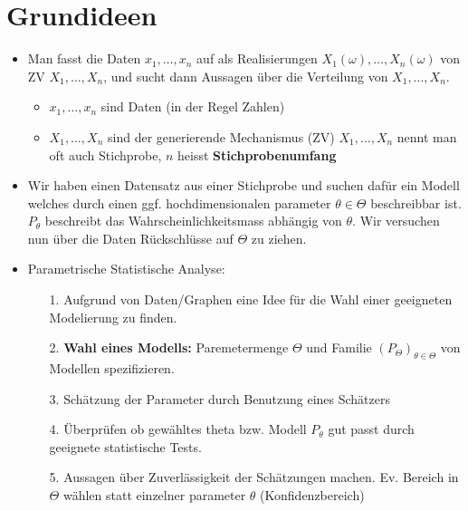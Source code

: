 
\section{Grundideen}
\begin{itemize}
    \item Man fasst die Daten $x_1, \dots, x_n$ auf als Realisierungen $X_1(\omega), \dots, X_n(\omega)$ von ZV $X_1, \dots, X_n$, und sucht dann Aussagen über die Verteilung von $X_1, \dots, X_n$.
        \begin{itemize}
            \item $x_1, \dots, x_n$ sind Daten (in der Regel Zahlen)
            \item $X_1, \dots, X_n$ sind der generierende Mechanismus (ZV)
             $X_1, \dots, X_n$ nennt man oft auch Stichprobe, $n$ heisst \textbf{Stichprobenumfang}
        \end{itemize}
    \item Wir haben einen Datensatz aus einer Stichprobe und suchen dafür ein Modell welches durch einen ggf. hochdimensionalen parameter $\theta \in \Theta$ beschreibbar ist. $P_\theta$ beschreibt das Wahrscheinlichkeitsmass abhängig von $\theta$. Wir versuchen nun über die Daten Rückschlüsse auf $\Theta$ zu ziehen.
    \item Parametrische Statistische Analyse:
        \begin{itemize}
            \item[1.] Aufgrund von Daten/Graphen eine Idee für die Wahl einer geeigneten Modelierung zu finden.
            \item[2.] \textbf{Wahl eines Modells:} Paremetermenge $\Theta$ und Familie $(P_\Theta)_{\theta \in \Theta}$ von Modellen spezifizieren.
            \item[3.] Schätzung der Parameter durch Benutzung eines Schätzers
            \item[4.] Überprüfen ob gewähltes theta bzw. Modell $P_\theta$ gut passt durch geeignete statistische Tests.
            \item[5.] Aussagen über Zuverlässigkeit der Schätzungen machen. Ev. Bereich in $\Theta$ wählen statt einzelner parameter $\theta$ (Konfidenzbereich)
        \end{itemize}
\end{itemize}
